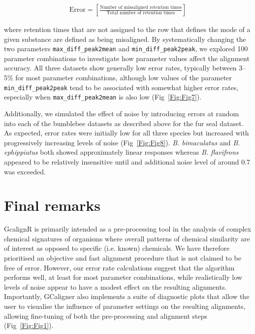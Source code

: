 \documentclass[10pt,letterpaper]{article}
\begin{document}
\begin{eqnarray}
\label{Eq:three}
\mathrm{Error} = \left[\frac{\textrm{Number of missaligned retention times}}{\textrm{Total number of retention times}}\right] 
\end{eqnarray}

where retention times that are not assigned to the row that defines the mode of a given substance are defined as being misaligned. By systematically changing the two parameters \texttt{max\_diff\_peak2mean} and \texttt{min\_diff\_peak2peak}, we explored 100 parameter combinations to investigate how parameter values affect the alignment accuracy. All three datasets show generally low error rates, typically between 3–5\% for most parameter combinations, although low values of the parameter \texttt{min\_diff\_peak2peak} tend to be associated with somewhat higher error rates, especially when \texttt{max\_diff\_peak2mean} is also low (Fig~\ref{Fig:Fig7}).\par

Additionally, we simulated the effect of noise by introducing errors at random into each of the bumblebee datasets as described above for the fur seal dataset. As expected, error rates were initially low for all three species but increased with progressively increasing levels of noise (Fig~\ref{Fig:Fig8}).  \textit{B. bimaculatus} and \textit{B. ephippiatus} both showed approximately linear responses whereas \textit{B. flavifrons} appeared to be relatively insensitive until and additional noise level of around 0.7 was exceeded.


\section*{Final remarks}
GcalignR is primarily intended as a pre-processing tool in the analysis of complex chemical signatures of organisms where overall patterns of chemical similarity are of interest as opposed to specific (i.e. known) chemicals. We have therefore prioritised an objective and fast alignment procedure that is not claimed to be free of error.  However, our error rate calculations suggest that the algorithm performs well, at least for most parameter combinations, while realistically low levels of noise appear to have a modest effect on the resulting alignments. Importantly, GCaligner also implements a suite of diagnostic plots that allow the user to visualise the influence of parameter settings on the resulting alignments, allowing fine-tuning of both the pre-processing and alignment steps (Fig~\ref{Fig:Fig1}).
\end{document}
